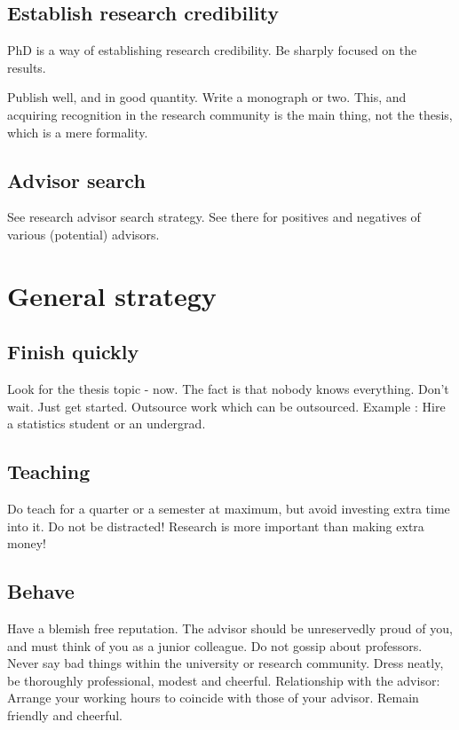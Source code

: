 \documentclass[oneside, article]{memoir}
\begin{document}
\subsection{Establish research credibility}
PhD is a way of establishing research credibility. Be sharply focused on the results.

\subitem Publish well, and in good quantity. Write a monograph or two. This, and acquiring recognition in the research community is the main thing, not the thesis, which is a mere formality.

\subsection{Advisor search}
See research advisor search strategy. See there for positives and negatives of various (potential) advisors.



\section{General strategy}
\subsection{Finish quickly}
\subitem Look for the thesis topic - now.
\subitem The fact is that nobody knows everything. Don't wait. Just get started.
\subitem Outsource work which can be outsourced. Example : Hire a statistics student or an undergrad.

\subsection{Teaching}
\subitem Do teach for a quarter or a semester at maximum, but avoid investing extra time into it. Do not be distracted! Research is more important than making extra money!

\subsection{Behave}
\subitem Have a blemish free reputation. The advisor should be unreservedly proud of you, and must think of you as a junior colleague.
\subitem Do not gossip about professors. Never say bad things within the university or research community.
\subitem Dress neatly, be thoroughly professional, modest and cheerful.
\subitem Relationship with the advisor:
\subsubitem Arrange your working hours to coincide with those of your advisor.
\subitem Remain friendly and cheerful.
\end{document}
